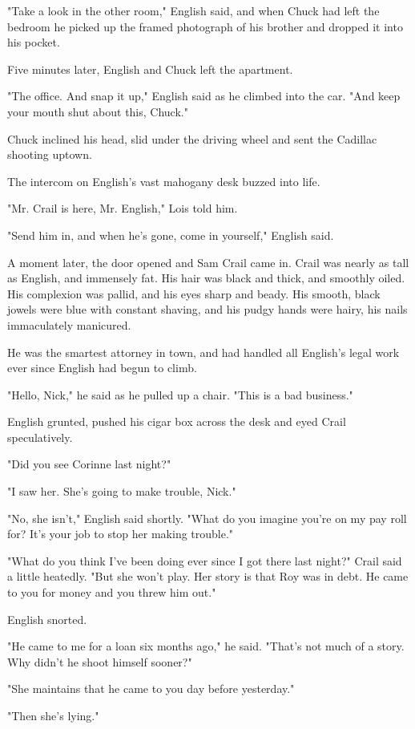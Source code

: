 \documentclass{novel}
\begin{document}
"Take a look in the other room," English said, and when Chuck had left the bedroom he picked up the framed photograph of his brother and dropped it into his pocket.

Five minutes later, English and Chuck left the apartment.

"The office. And snap it up," English said as he climbed into the car. "And keep your mouth shut about this, Chuck."

Chuck inclined his head, slid under the driving wheel and sent the Cadillac shooting uptown.

The intercom on English's vast mahogany desk buzzed into life.

"Mr. Crail is here, Mr. English," Lois told him.

"Send him in, and when he's gone, come in yourself," English said.

A moment later, the door opened and Sam Crail came in. Crail was nearly as tall as English, and immensely fat. His hair was black and thick, and smoothly oiled. His complexion was pallid, and his eyes sharp and beady. His smooth, black jowels were blue with constant shaving, and his pudgy hands were hairy, his nails immaculately manicured.

He was the smartest attorney in town, and had handled all English's legal work ever since English had begun to climb.

"Hello, Nick," he said as he pulled up a chair. "This is a bad business."

English grunted, pushed his cigar box across the desk and eyed Crail speculatively.

"Did you see Corinne last night?"

"I saw her. She's going to make trouble, Nick."

"No, she isn't," English said shortly. "What do you imagine you're on my pay roll for? It's your job to stop her making trouble."

"What do you think I've been doing ever since I got there last night?" Crail said a little heatedly. "But she won't play. Her story is that Roy was in debt. He came to you for money and you threw him out."

English snorted.

"He came to me for a loan six months ago," he said. "That's not much of a story. Why didn't he shoot himself sooner?"

"She maintains that he came to you day before yesterday."

"Then she's lying."
\end{document}
